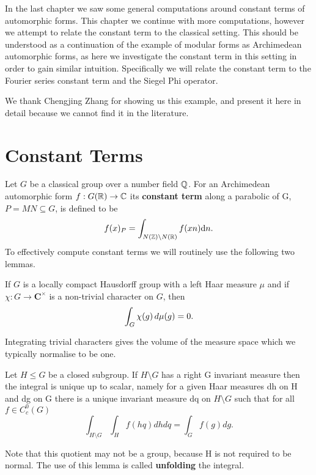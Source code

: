 \label{ch:sigel-phi}
In the last chapter we saw some general computations around constant terms of automorphic forms. This chapter we continue with more computations, however we attempt to relate the constant term to the classical setting. This should be understood as a continuation of the example of modular forms as Archimedean automorphic forms, as here we investigate the constant term in this setting in order to gain similar intuition. Specifically we will relate the constant term to the Fourier series constant term and the Siegel Phi operator. 

We thank Chengjing Zhang for showing us this example, and present it here in detail because we cannot find it in the literature.



\section{Constant Terms}
Let \(G\) be a classical group over a number field \(\Q\). For an Archimedean automorphic form \(f: G(\R) \to \C\) its \textbf{constant term } along a parabolic of G, \(P=MN\subseteq G\), is defined to be \cite[8.6]{getzIntroductionAutomorphicRepresentations2024}
\[f(x)_P = \int_{N(\Z)\backslash N(\R)}f(xn) \mathrm{d}n.\]
To effectively compute constant terms we will routinely use the following two lemmas.

\begin{Theorem}\label{integrate_unitary_char}
	If \(G\) is a locally compact Hausdorff group with a left Haar measure \(\mu\) and if \(\chi\colon G\to \mathbf C^\times\) is a non-trivial character on \(G\), then
	\[ \int^{}_{G}\chi(g)\,d\mu(g) = 0. \]
\end{Theorem}
Integrating trivial characters gives the volume of the measure space which we typically normalise to be one.

\begin{Theorem}
	Let \(H\leq G\) be a closed subgroup. If \(H\setminus G\) has a right G invariant measure then the integral is unique up to scalar, namely for a given Haar measures dh on H and dg on G there is a unique invariant measure dq on \(H\setminus G\) such that for all \(f\in C_c^0(G)\)
	\[\int_{H\setminus G}\int_H f(hq)dhdq = \int_G f(g) dg.\]
\end{Theorem}
Note that this quotient may not be a group, because H is not required to be normal. The use of this lemma is called \textbf{unfolding} the integral.

